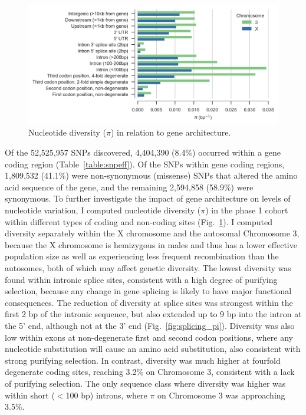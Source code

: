 \documentclass[a4paper,11pt,abstracton,hidelinks]{scrartcl}
\begin{document}
\begin{figure}[t!]
\centering
\includegraphics[width=1.1\textwidth,center]{artwork/chapter3/feature_pi.jpeg}
\caption{Nucleotide diversity ($\pi$) in relation to gene architecture.
}
%
\label{fig:feature_pi}
\end{figure}



%
Of the 52,525,957 SNPs discovered, 4,404,390 (8.4\%) occurred within a gene coding region (Table~\ref{table:snpeff}).
%
Of the SNPs within gene coding regions, 1,809,532 (41.1\%) were non-synonymous (missense) SNPs that altered the amino acid sequence of the gene, and the remaining 2,594,858 (58.9\%) were synonymous.
%
To further investigate the impact of gene architecture on levels of nucleotide variation, I computed nucleotide diversity ($\pi$) in the phase 1 cohort within different types of coding and non-coding sites (Fig.~\ref{fig:feature_pi}).
%
I computed diversity separately within the X chromosome and the autosomal Chromosome 3, because the X chromosome is hemizygous in males and thus has a lower effective population size as well as experiencing less frequent recombination than the autosomes, both of which may affect genetic diversity.
%
The lowest diversity was found within intronic splice sites, consistent with a high degree of purifying selection, because any change in gene splicing is likely to have major functional consequences.
%
The reduction of diversity at splice sites was strongest within the first 2 bp of the intronic sequence, but also extended up to 9 bp into the intron at the 5' end, although not at the 3' end (Fig.~\ref{fig:splicing_pi}).
%
Diversity was also low within exons at non-degenerate first and second codon positions, where any nucleotide substitution will cause an amino acid substitution, also consistent with strong purifying selection.
%
In contrast, diversity was much higher at fourfold degenerate coding sites, reaching 3.2\% on Chromosome 3, consistent with a lack of purifying selection.
%
The only sequence class where diversity was higher was within short ($<$100 bp) introns, where $\pi$ on Chromosome 3 was approaching 3.5\%.
\end{document}
